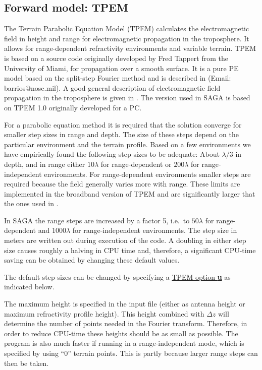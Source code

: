 \documentclass{saclantc}
\begin{document}
\subsection{Forward model: TPEM }

The Terrain Parabolic Equation Model ({\sf TPEM}) calculates the
  electromagnetic field in height and range for electromagnetic
  propagation in the troposphere.  It allows for range-dependent
  refractivity environments and variable terrain.  {\sf TPEM} is based on
  a source code originally developed by Fred Tappert from
  the University of Miami, for propagation over a smooth surface.  It
  is a pure PE model based on the split-step Fourier method and is
  described in \cite{barrios:92,barrios:94} (Email: barrios@nosc.mil).
A good general description of electromagnetic field propagation in the
troposphere is given in \cite{agard94}.
The version used in {\sf SAGA} is based on {\sf TPEM} 1.0 originally 
developed for a PC.

For a parabolic equation method it is required that the
solution converge for smaller step sizes in range
and depth. The size of these steps depend on the particular
environment and the terrain profile. Based on a few environments we
have empirically found the following step sizes to be adequate:
About
$\lambda/3$ in depth, and in range either $10 \lambda$ for range-dependent or $200 \lambda$ for range-independent
environments. For range-dependent environments smaller steps are
required because the field generally varies more with range. 
These limits are implemented in the broadband version of
{\sf TPEM} and are significantly larger that the ones used in
\cite{barrios:94}.  

In {\sf SAGA} the range steps are
increased by a factor 5, i.e.\ to $50 \lambda$ for range-dependent
and $1000 \lambda$ for range-independent environments.  The
step size in meters are written out during execution of the code.  A
doubling in either step size causes roughly a halving in CPU time
and, therefore, a significant CPU-time saving can be obtained by
changing these default values.

The default step sizes can be changed by specifying a \underline{TPEM
option {\bf u}} as indicated below.

The maximum height is specified in the input file (either as antenna
height or maximum refractivity profile height). This
height combined with $\Delta z$ will determine the number of points
needed in the Fourier transform. Therefore, in order to reduce CPU-time
these heights should be as
small as possible. The program is also much faster if running in
a range-independent mode, which is specified
by using ``0'' terrain points. This is partly because larger range
steps can then be taken.
\end{document}
